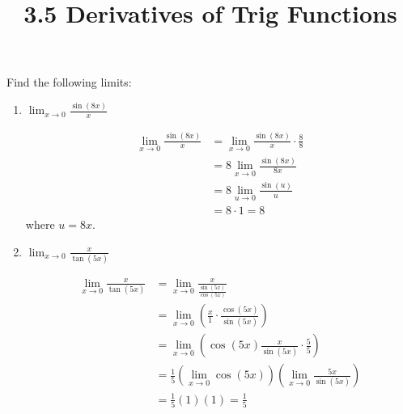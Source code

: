 \documentclass[nooutcomes,handout]{ximera}
\title{3.5 Derivatives of Trig Functions}
\begin{document}
\begin{abstract}		\end{abstract}
\maketitle


\begin{problem}
Find the following limits:

	\begin{enumerate}
	
	\item  $\lim_{x \to 0} \frac{\sin(8x)}{x}$
			\begin{freeResponse}
			\begin{align*}
			\lim_{x \to 0} \frac{\sin(8x)}{x} &= \lim_{x \to 0} \frac{\sin(8x)}{x} \cdot \frac{8}{8}  \\
			&= 8 \lim_{x \to 0} \frac{\sin(8x)}{8x}  \\
			&= 8 \lim_{u \to 0} \frac{\sin(u)}{u}  \\
			&= 8 \cdot 1 = 8
			\end{align*}
			where $u = 8x$.  
			\end{freeResponse}
			
	
	\item  $\lim_{x \to 0} \frac{x}{\tan(5x)}$
			\begin{freeResponse}
			\begin{align*}
			\lim_{x \to 0} \frac{x}{\tan(5x)} &= \lim_{x \to 0} \frac{x}{\frac{\sin(5x)}{\cos(5x)}}  \\
			&= \lim_{x \to 0} \left( \frac{x}{1} \cdot \frac{\cos(5x)}{\sin(5x)} \right)  \\
			&= \lim_{x \to 0} \left( \cos(5x) \frac{x}{\sin(5x)} \cdot \frac{5}{5} \right)  \\
			&= \frac{1}{5} \left( \lim_{x \to 0} \cos(5x) \right) \left( \lim_{x \to 0} \frac{5x}{\sin(5x)} \right)  \\
			&= \frac{1}{5} (1) (1) = \frac{1}{5}
			\end{align*}
			\end{freeResponse}
			
			
			
	\end{enumerate}
\end{problem}
	
\end{document}
